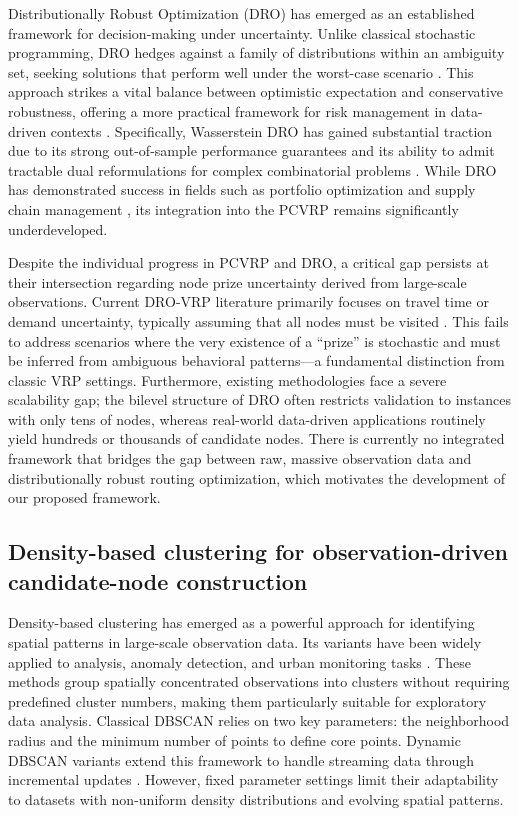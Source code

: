 \documentclass[preprint,12pt,authoryear]{elsarticle}
\theoremstyle{definition}
\begin{document}
Distributionally Robust Optimization (DRO) has emerged as an established framework for decision-making under uncertainty. Unlike classical stochastic programming, DRO hedges against a family of distributions within an ambiguity set, seeking solutions that perform well under the worst-case scenario \citep{wiesemann2014distributionally,gao2024wasserstein,delage2022value}. This approach strikes a vital balance between optimistic expectation and conservative robustness, offering a more practical framework for risk management in data-driven contexts \citep{wu2025generalization}. Specifically, Wasserstein DRO has gained substantial traction due to its strong out-of-sample performance guarantees and its ability to admit tractable dual reformulations for complex combinatorial problems \citep{mohajerin2018data,kuhn2011primal,blanchet2022optimal,he2025higher}. While DRO has demonstrated success in fields such as portfolio optimization and supply chain management \citep{chen2023distributionally,wang2024reliable}, its integration into the PCVRP remains significantly underdeveloped.

Despite the individual progress in PCVRP and DRO, a critical gap persists at their intersection regarding node prize uncertainty derived from large-scale observations. Current DRO-VRP literature primarily focuses on travel time or demand uncertainty, typically assuming that all nodes must be visited \citep{marinakis2013particle,ota2025hardness}. This fails to address scenarios where the very existence of a ``prize'' is stochastic and must be inferred from ambiguous behavioral patterns---a fundamental distinction from classic VRP settings. Furthermore, existing methodologies face a severe scalability gap; the bilevel structure of DRO often restricts validation to instances with only tens of nodes, whereas real-world data-driven applications routinely yield hundreds or thousands of candidate nodes. There is currently no integrated framework that bridges the gap between raw, massive observation data and distributionally robust routing optimization, which motivates the development of our proposed framework.

\subsection{Density-based clustering for observation-driven candidate-node construction}\label{subsec:clustering_nodes}

Density-based clustering has emerged as a powerful approach for identifying spatial patterns in large-scale observation data. Its variants have been widely applied to analysis, anomaly detection, and urban monitoring tasks \citep{hahsler2019dbscan}. These methods group spatially concentrated observations into clusters without requiring predefined cluster numbers, making them particularly suitable for exploratory data analysis. Classical DBSCAN relies on two key parameters: the neighborhood radius and the minimum number of points to define core points. Dynamic DBSCAN variants extend this framework to handle streaming data through incremental updates \citep{kim2024constrained}. However, fixed parameter settings limit their adaptability to datasets with non-uniform density distributions and evolving spatial patterns.
\end{document}
